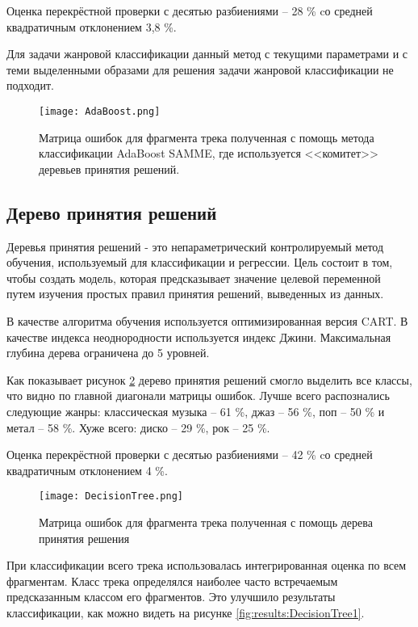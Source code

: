 Оценка перекрёстной проверки с десятью разбиениями -- 28 \% cо средней квадратичным отклонением 3,8 \%.  

Для задачи жанровой классификации данный метод с текущими параметрами и с теми выделенными образами для решения задачи жанровой классификации не подходит. 

\begin{figure}[h]
\centering
  \texttt{[image: AdaBoost.png]}
  \caption{Матрица ошибок для фрагмента трека  полученная с помощь метода классификации AdaBoost SAMME, где используется <<комитет>>  деревьев принятия решений.}
  \label{fig:results:adaboost}
\end{figure}

\subsection{Дерево принятия решений}

Деревья принятия решений - это непараметрический контролируемый метод обучения, используемый для классификации и регрессии. Цель состоит в том, чтобы создать модель, которая предсказывает значение целевой переменной путем изучения простых правил принятия решений, выведенных из данных.

В качестве алгоритма обучения используется оптимизированная версия CART. В качестве индекса неоднородности используется индекс Джини. Максимальная глубина дерева ограничена до 5 уровней.

Как показывает рисунок \ref{fig:results:DecisionTree} дерево принятия решений смогло выделить все классы, что видно по главной диагонали матрицы ошибок. Лучше всего распознались следующие жанры: классическая музыка -- 61 \%, джаз -- 56 \%, поп -- 50 \% и метал -- 58 \%. Хуже всего: диско -- 29 \%, рок -- 25 \%. 


Оценка перекрёстной проверки с десятью разбиениями -- 42 \% cо средней квадратичным отклонением 4 \%.  

\begin{figure}[h]
\centering
  \texttt{[image: DecisionTree.png]}
  \caption{Матрица ошибок для фрагмента трека полученная с помощь дерева принятия решения}
  \label{fig:results:DecisionTree}
\end{figure}

При классификации всего трека использовалась интегрированная оценка по всем фрагментам. Класс трека определялся наиболее часто встречаемым предсказанным классом его фрагментов. Это улучшило результаты классификации, как можно видеть на рисунке \ref{fig:results:DecisionTree1}. 

